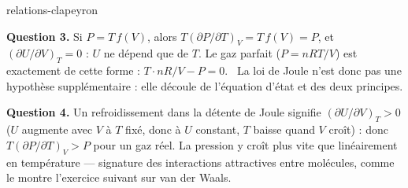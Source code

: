 \begin{exo}{relations-clapeyron}
\begin{solution}
\textbf{Question 3.} Si $P = T\,f(V)$, alors $T\left(\partial P/\partial T\right)_V = T\,f(V) = P$, et $\left(\partial U/\partial V\right)_T = 0$ : $U$ ne dépend que de $T$. Le gaz parfait ($P = nRT/V$) est exactement de cette forme : $T\cdot nR/V - P = 0$. \checkmark\ La loi de Joule n'est donc pas une hypothèse supplémentaire : elle découle de l'équation d'état et des deux principes.

\textbf{Question 4.} Un refroidissement dans la détente de Joule signifie $\left(\partial U/\partial V\right)_T > 0$ ($U$ augmente avec $V$ à $T$ fixé, donc à $U$ constant, $T$ baisse quand $V$ croît) : donc $T\left(\partial P/\partial T\right)_V > P$ pour un gaz réel. La pression y croît plus vite que linéairement en température — signature des interactions attractives entre molécules, comme le montre l'exercice suivant sur van der Waals.
\end{solution}
\end{exo}

